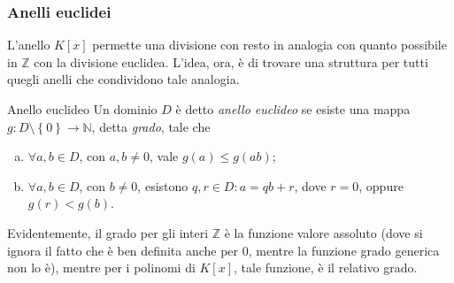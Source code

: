 \documentclass[11pt, a4paper]{scrartcl}
\theoremstyle{definition}
\numberwithin{esempio}{section}
\theoremstyle{definition}
\numberwithin{obs}{section}
\numberwithin{nota}{section}
\numberwithin{equation}{subsection}
\begin{document}
\subsubsection{Anelli euclidei}
L'anello $K[x]$ permette una divisione con resto in analogia con quanto possibile in $\mathbb{Z}$ con la divisione euclidea.
L'idea, ora, \`e di trovare una struttura per tutti quegli anelli che condividono tale analogia.
\begin{definizione}
	{Anello euclideo}{}
	Un dominio $D$ \`e detto \textit{anello euclideo} se esiste una mappa $g : D \setminus\left\{ 0 \right\} \to \mathbb{N}$, detta \textit{grado}, tale che
	\begin{enumerate}[(a).]
		\item $\forall a,b \in D$, con $a,b\neq 0$, vale $g(a) \le g(ab)$;
		\item $\forall a,b \in D$, con $b\neq 0$, esistono $q,r \in D : a = qb + r$, dove $r = 0$, oppure $g(r) < g(b)$.
	\end{enumerate}
\end{definizione}
\noindent Evidentemente, il grado per gli interi $\mathbb{Z}$ \`e la funzione valore assoluto (dove si ignora il fatto che \`e ben definita anche per $0$, mentre la funzione grado generica non lo \`e), mentre per i polinomi di $K[x]$, tale funzione, \`e il relativo grado.
\end{document}
